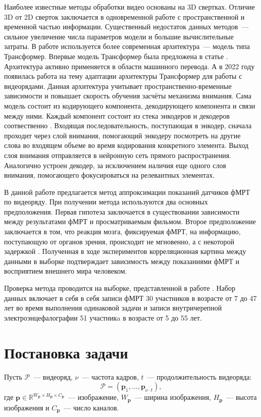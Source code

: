 \documentclass[12pt,twoside]{article}
\begin{document}
Наиболее известные методы обработки видео основаны на 3D свертках. 
Отличие 3D от 2D сверток заключается в одновременной работе с пространственной  
и временной частью информации. Существенный недостаток данных методов~--- 
сильное увеличение числа параметров модели и большие вычислительные затраты.
В работе используется более современная архитектура~--- модель типа Трансформер.
Впервые модель Трансформер была предложена в статье
\citep{https://doi.org/10.48550/arxiv.1706.03762}. Архитектура активно применяется в области машинного перевода.
А в 2022 году появилась работа \citep{transformer} на тему адаптации архитектуры Трансформер для работы с видеорядами. 
Данная архитектура учитывает пространственно-временные зависимости и повышает скорость обучения засчёты механизма внимания.
Сама модель состоит из кодирующего компонента, декодирующего компонента и связи между ними. Каждый компонент состоит из стека 
энкодеров и декодеров соотвественно \citep{badrinarayanan2017segnet}. 
Входящая последовательность, поступающая в энкодер, сначала проходит через слой внимания, помогающий энкодеру 
посмотреть на другие слова во входящем объеме во время кодирования конкретного элемента. 
Выход слоя внимания отправляется в нейронную сеть прямого распространения. 
Аналогично устроен декодер, за исключением наличия еще одного слоя внимания, помогающего фокусироваться на релевантных элементах.

В данной работе предлагается метод аппроксимации показаний датчиков фМРТ по видеоряду. 
При получении метода используются два основных предположения. Первая гипотеза заключается в существовании зависимости между результатами фМРТ и просматриваемым фильмом.
Второе предположение заключается в том, что реакция мозга, фиксируемая фМРТ, на информацию, поступающую от органов зрения, происходит не мгновенно, а с некоторой задержкой \citep{Demidov}. 
Полученная в ходе экспериментов корреляционная картина между данными в выборке подтверждает 
зависимость между показаниями фМРТ и восприятием внешнего мира человеком. 

Проверка метода проводится на выборке, представленной в работе \citep{Berezutskaya2022}. 
Набор данных включает в себя в себя записи фМРТ 30 участников в возрасте от 7 до 47 лет во время 
выполнения одинаковой задачи и записи внутричерепной электроэнцефалографии 51 участникa в возрасте от 5 до 55 лет. 


\section{Постановка задачи}
Пусть $\bm{\mathcal{P}}$~--- видеоряд, $\nu$~--- частота кадров, $t$~--- продолжительность видеоряда:
\begin{equation}
    \bm{\mathcal{P}} = (\bm{p}_{1}, \dots, \bm{p}_{\nu \cdot t}),
\end{equation}
где $\bm{p} \in \mathbb{R}^{W_{\bm{p}} \times H_{\bm{p}} \times C_{\bm{p}}}$~--- изображение, $W_{\bm{p}}$~---
ширина изображения, $H_{\bm{p}}$~--- высота изображения и $C_{\bm{p}}$~--- число каналов.
\end{document}
